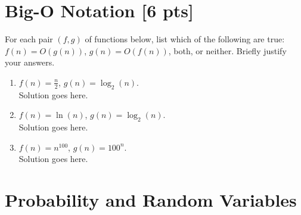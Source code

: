 \documentclass[a4paper]{article}
\theoremstyle{definition}
\newenvironment{soln}{
    \leavevmode\color{blue}\ignorespaces
}{}
\begin{document}
\section{Big-O Notation [6 pts]}
For each pair $(f, g)$ of functions below, list which of the following
are true: $f(n) = O(g(n))$, $g(n) = O(f(n))$, both, or
neither. Briefly justify your answers.
\begin{enumerate}
	\item 	$f(n) = \frac{n}{2}$, $g(n) = \log_{2}(n)$.\\
	    \begin{soln}  Solution goes here. \end{soln}
	\item 	$f(n) = \ln(n)$, $g(n) = \log_{2}(n)$.\\
	    \begin{soln}  Solution goes here. \end{soln}
	\item 	$f(n) = n^{100}$, $g(n) = 100^n$.\\
	    \begin{soln}  Solution goes here. \end{soln}
\end{enumerate}





\section{Probability and Random Variables }
\end{document}
